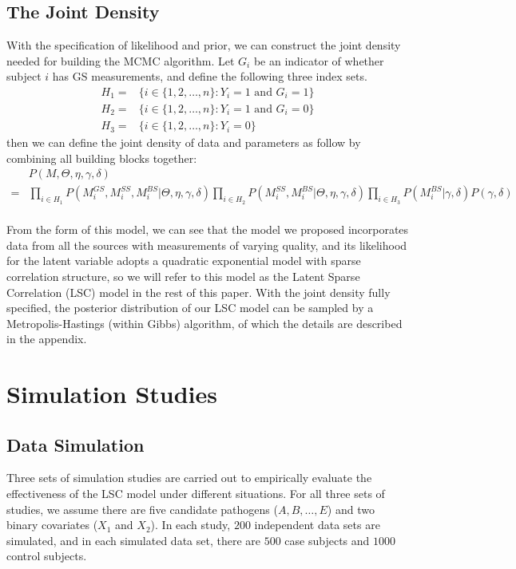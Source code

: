 \documentclass[11 pt, a4paper]{article}  %
\begin{document}
\subsection{The Joint Density}
With the specification of likelihood and prior, we can construct the joint density needed for building the MCMC algorithm. Let $G_i$ be an indicator of whether subject $i$ has GS measurements, and define the following three index sets.
\begin{align*}
H_1 = & \Big \{i \in \{1,2,\ldots, n\}: Y_i=1 \text{ and } G_i=1 \Big\}\\
H_2 = & \Big \{i \in \{1,2,\ldots, n\}: Y_i=1 \text{ and } G_i=0 \Big\}\\
H_3 = & \Big \{i \in \{1,2,\ldots, n\}: Y_i=0 \Big\}
\end{align*}
then we can define the joint density of data and parameters as follow by combining all building blocks together:
\begin{align*}
& P(M,\Theta, \eta, \gamma, \delta) \\
= & \prod_{i\in H_1} P(M_i^{GS},M_i^{SS},M_i^{BS} | \Theta, \eta, \gamma, \delta) 
\prod_{i\in H_2} P(M_i^{SS},M_i^{BS} |\Theta, \eta, \gamma, \delta)
\prod_{i\in H_3} P(M_i^{BS} |\gamma, \delta) P(\gamma, \delta)
\end{align*}
\\
From the form of this model, we can see that the model we proposed incorporates data from all the sources with measurements of varying quality, and its likelihood for the latent variable adopts a quadratic exponential model with sparse correlation structure, so we will refer to this model as the Latent Sparse Correlation (LSC) model in the rest of this paper. With the joint density fully specified, the posterior distribution of our LSC model can be sampled by a Metropolis-Hastings (within Gibbs) algorithm, of which the details are described in the appendix.


\newpage
\section{Simulation Studies}
\subsection{Data Simulation}
Three sets of simulation studies are carried out to empirically evaluate the effectiveness of the LSC model under different situations. For all three sets of studies, we assume there are five candidate pathogens ($A, B, \ldots, E$) and two binary covariates ($X_1$ and $X_2$). In each study, $200$ independent data sets are simulated, and in each simulated data set, there are $500$ case subjects and $1000$ control subjects.\\
\end{document}
